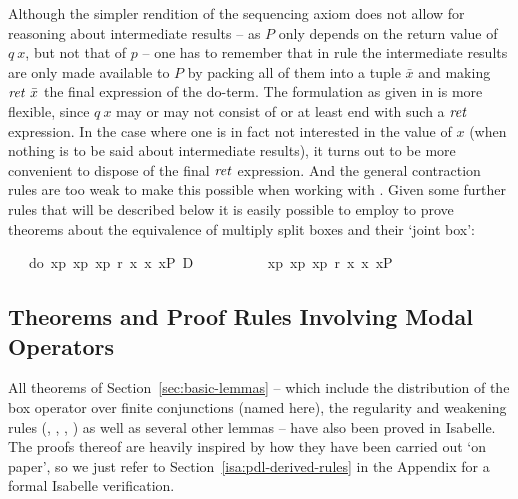 Although the simpler rendition of the sequencing axiom does not allow for reasoning
about intermediate results -- as $P$ only depends on the return value of $q\ x$,
but not that of $p$ -- one has to remember that in rule  the
intermediate results are only made available to $P$ by packing all of them into
a tuple $\bar x$ and making $\mathit{ret}~\bar x$ the final expression of the do-term.
The formulation as given in  is more flexible, since $q\ x$
may or may not consist of or at least end with such a $\mathit{ret}$ expression. In the
case where one is in fact not interested in the value of $x$ (\EG when nothing
is to be said about intermediate results), it turns out to be more convenient to
dispose of the final $\mathit{ret}$ expression. And the general contraction rules are
too weak to make this possible when working with . Given some
further rules that will be described below it is easily possible to employ
 to prove theorems about the equivalence of multiply split
boxes and their `joint box':
\begin{isabellebody}
\isanewline
{}\ {\isachardoublequote}{\isasymturnstile}\ {\isacharbrackleft}{\isacharhash}\ do\ {\isacharbraceleft}x{}{\isasymleftarrow}p{}{\isacharsemicolon}\ x{}{\isasymleftarrow}p{}{\isacharsemicolon}\ x{}{\isasymleftarrow}p{}{\isacharsemicolon}\ r\ x{}\ x{}\ x{}{\isacharbraceright}{\isacharbrackright}P\ {\isasymlongleftrightarrow}\isactrlsub D\isanewline
\ \ \ \ \ \ \ \ \ {\isacharbrackleft}{\isacharhash}\ x{}{\isasymleftarrow}p{}{\isacharbrackright}{\isacharbrackleft}{\isacharhash}\ x{}{\isasymleftarrow}p{}{\isacharbrackright}{\isacharbrackleft}{\isacharhash}\ x{}{\isasymleftarrow}p{}{\isacharbrackright}{\isacharbrackleft}{\isacharhash}\ r\ x{}\ x{}\ x{}{\isacharbrackright}P{\isachardoublequote}\isanewline
\end{isabellebody}

\subsection{Theorems and Proof Rules Involving Modal Operators}
\label{sec:theorems-proof-rules}

All theorems of Section~\ref{sec:basic-lemmas} -- which include the distribution
of the box operator over finite conjunctions (named 
here), the regularity and weakening rules (,
, , ) as well as several
other lemmas -- have also been proved in Isabelle. The proofs thereof are heavily
inspired by how they have been carried out `on paper', so we just refer to
Section~\ref{isa:pdl-derived-rules} in the Appendix for a formal Isabelle
verification.

